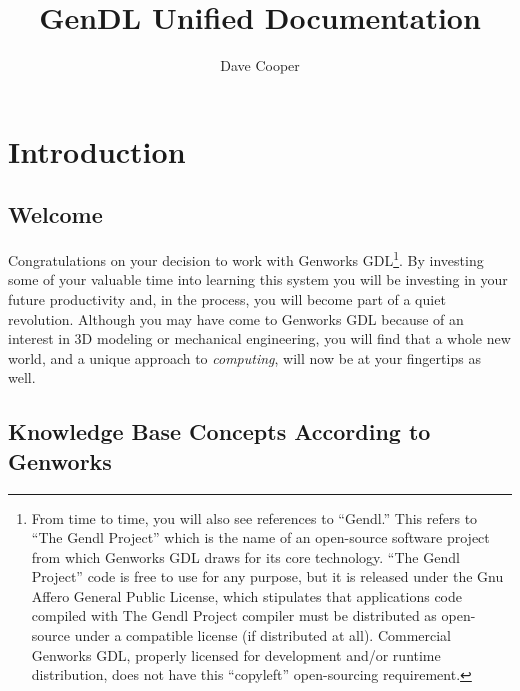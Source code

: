 \documentclass [11pt]{book}
\author {Dave Cooper}
\title {GenDL Unified Documentation}
\begin{document}
\frontmatter



\maketitle



\tableofcontents



\mainmatter



\chapter{Introduction}

\label{chap:introduction}



\section{Welcome}

\label{sec:welcome}

Congratulations on your decision to work with Genworks GDL\footnote{From time to time, you will also see references to
``Gendl.'' This refers to ``The Gendl Project'' which is the name of
an open-source software project from which Genworks GDL draws for its
core technology. ``The Gendl Project'' code is free to use for any
purpose, but it is released under the Gnu Affero General Public
License, which stipulates that applications code compiled with The
Gendl Project compiler must be distributed as open-source under a
compatible license (if distributed at all). Commercial Genworks GDL,
properly licensed for development and/or runtime distribution, does
not have this ``copyleft'' open-sourcing requirement.}. By investing some of your valuable time into learning this
system you will be investing in your future productivity and, in the
process, you will become part of a quiet revolution. Although you may
have come to Genworks GDL because of an interest in 3D modeling or
mechanical engineering, you will find that a whole new world, and a
unique approach to \emph{computing}, will now be at your fingertips as well.

\section{Knowledge Base Concepts According to Genworks}
\end{document}

